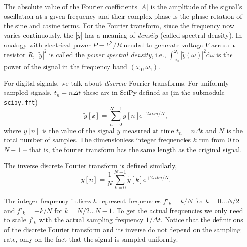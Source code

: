\documentclass{article}
\newcommand{\ls}[1]{\lstinline{#1}}
\begin{document}
The absolute value of the Fourier coefficients $|A|$ is the amplitude of the signal's oscillation at a given frequency and their complex phase is the phase rotation of the sine and cosine terms. For the Fourier transform, since the frequency now varies continuously, the $|\tilde y|$ has a meaning of \emph{density} (called spectral density). In analogy with electrical power $P = V^2/R$ needed to generate voltage $V$ across a resistor $R$, $|\tilde y|^2$ is called the \emph{power spectral density}, i.e., $\int_{\omega_0}^{\omega_1} |\tilde y (\omega)|^2\mathrm{d}\omega$ is the power of the signal in the frequency band $(\omega_0, \omega_1)$.

For digital signals, we talk about \emph{discrete} Fourier transforms. For uniformly sampled signals, $t_n = n\Delta t$ these are in SciPy defined as (in the submodule \ls{scipy.fft})
\begin{equation}
    \tilde y[k] = \sum_{n=0}^{N-1}y[n]e^{-2\pi i kn/N},
\end{equation}
where $y[n]$ is the value of the signal $y$ measured at time $t_n = n\Delta t$ and $N$ is the total number of samples. The dimensionless integer frequencies $k$ run from 0 to $N-1$ -- that is, the fourier transform has the same length as the original signal. 

The inverse discrete Fourier transform is defined similarly,
\begin{equation}
    y[n] = \frac{1}{N}\sum_{k=0}^{N-1}\tilde y[k]e^{+2\pi i kn/N}.
\end{equation}

The integer frequency indices $k$ represent frequencies $f'_k = k/N$ for $k=0\dots N/2$ and $f'_k = -k/N$ for $k=N/2\dots N-1$. To get the actual frequencies we only need to scale $f'_k$ with the actual sampling frequency $1/\Delta t$. Notice that the definitions of the discrete Fourier transform and its inverse do not depend on the sampling rate, only on the fact that the signal is sampled uniformly.
\end{document}
